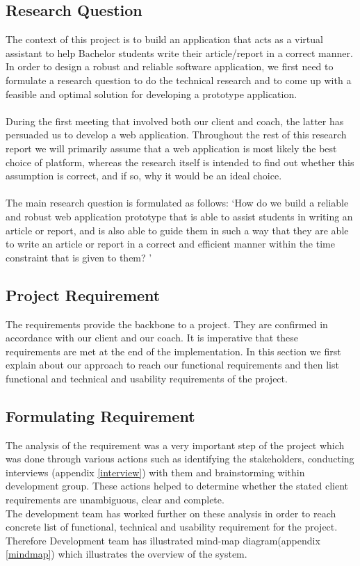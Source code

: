 \subsection{Research Question}

The context of this project is to build an application that acts as a virtual assistant to help Bachelor students write their article/report in a correct manner. In order to design a robust and reliable software application, we first need to formulate a research question to do the technical research and to come up with a feasible and optimal solution for developing a prototype application.\\\\

During the first meeting that involved both our client and coach, the latter has persuaded us to develop a web application. Throughout the rest of this research report we will primarily assume that a web application is most likely the best choice of platform, whereas the research itself is intended to find out whether this assumption is correct, and if so, why it would be an ideal choice. \\\\

The main research question is formulated as follows: `How do we build a reliable and robust web application prototype that is able to assist students in writing an article or report, and is also able to guide them in such a way that they are able to write an article or report in a correct and efficient manner within the time constraint that is given to them? '

\subsection{Project Requirement}

The requirements provide the backbone to a project. They are confirmed in accordance with our client and our coach. It is imperative that these requirements are met at the end of the implementation. In this section we first explain about our approach to reach our functional requirements and then list functional and technical and usability requirements of the project.

\subsection{Formulating Requirement} %
\label{sub:subsection_name}
The analysis of the requirement was a very important step of the project which was done through various actions such as identifying the stakeholders, conducting interviews (appendix \ref{interview}) with them and brainstorming within development group. These actions helped to determine whether the stated client requirements are unambiguous, clear and complete. \\
The development team has worked further on these analysis in order to  reach concrete list of functional, technical and usability requirement for the project. Therefore Development team has illustrated mind-map diagram(appendix \ref{mindmap}) which illustrates the overview of the system.

